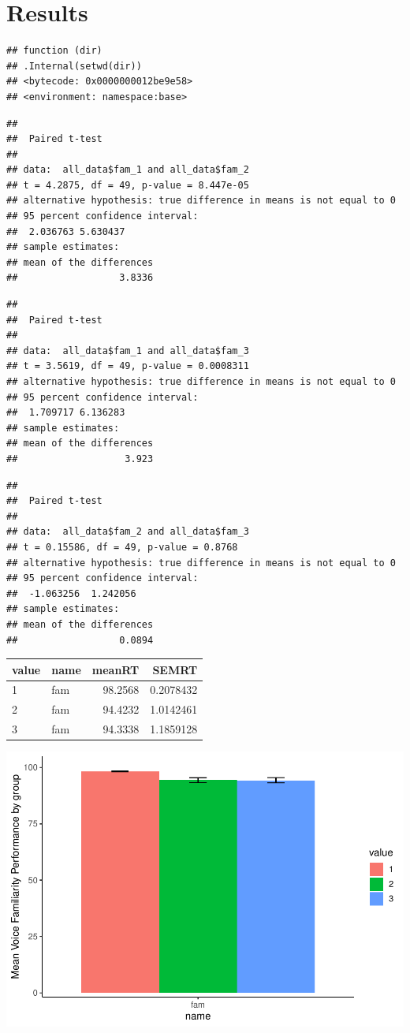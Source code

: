 \documentclass[
  english,
  man]{apa6}
\begin{document}
\hypertarget{results}{%
\section{Results}\label{results}}

\begin{verbatim}
## function (dir) 
## .Internal(setwd(dir))
## <bytecode: 0x0000000012be9e58>
## <environment: namespace:base>
\end{verbatim}

\begin{verbatim}
## 
##  Paired t-test
## 
## data:  all_data$fam_1 and all_data$fam_2
## t = 4.2875, df = 49, p-value = 8.447e-05
## alternative hypothesis: true difference in means is not equal to 0
## 95 percent confidence interval:
##  2.036763 5.630437
## sample estimates:
## mean of the differences 
##                  3.8336
\end{verbatim}

\begin{verbatim}
## 
##  Paired t-test
## 
## data:  all_data$fam_1 and all_data$fam_3
## t = 3.5619, df = 49, p-value = 0.0008311
## alternative hypothesis: true difference in means is not equal to 0
## 95 percent confidence interval:
##  1.709717 6.136283
## sample estimates:
## mean of the differences 
##                   3.923
\end{verbatim}

\begin{verbatim}
## 
##  Paired t-test
## 
## data:  all_data$fam_2 and all_data$fam_3
## t = 0.15586, df = 49, p-value = 0.8768
## alternative hypothesis: true difference in means is not equal to 0
## 95 percent confidence interval:
##  -1.063256  1.242056
## sample estimates:
## mean of the differences 
##                  0.0894
\end{verbatim}

\begin{tabular}{l|l|r|r}
\hline
value & name & meanRT & SEMRT\\
\hline
1 & fam & 98.2568 & 0.2078432\\
\hline
2 & fam & 94.4232 & 1.0142461\\
\hline
3 & fam & 94.3338 & 1.1859128\\
\hline
\end{tabular}

\includegraphics{APAreport_files/figure-latex/unnamed-chunk-5-1.pdf}
\end{document}
